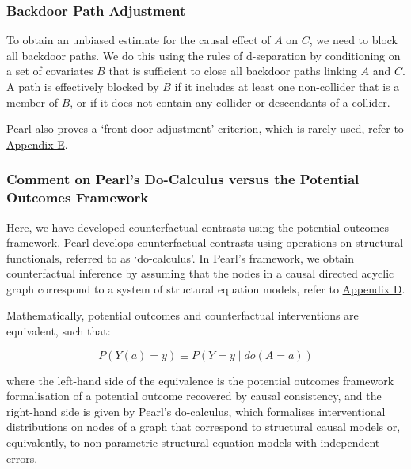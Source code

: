\documentclass[
  single column]{article}
\begin{document}
\subsubsection{Backdoor Path Adjustment}\label{backdoor-path-adjustment}

To obtain an unbiased estimate for the causal effect of \(A\) on \(C\),
we need to block all backdoor paths. We do this using the rules of
d-separation by conditioning on a set of covariates \(B\) that is
sufficient to close all backdoor paths linking \(A\) and \(C\). A path
is effectively blocked by \(B\) if it includes at least one non-collider
that is a member of \(B\), or if it does not contain any collider or
descendants of a collider.

Pearl also proves a `front-door adjustment' criterion, which is rarely
used, refer to \hyperref[id-app-e]{Appendix E}.

\subsubsection{Comment on Pearl's Do-Calculus versus the Potential
Outcomes
Framework}\label{comment-on-pearls-do-calculus-versus-the-potential-outcomes-framework}

Here, we have developed counterfactual contrasts using the potential
outcomes framework. Pearl develops counterfactual contrasts using
operations on structural functionals, referred to as `do-calculus'. In
Pearl's framework, we obtain counterfactual inference by assuming that
the nodes in a causal directed acyclic graph correspond to a system of
structural equation models, refer to \hyperref[id-app-d]{Appendix D}.

Mathematically, potential outcomes and counterfactual interventions are
equivalent, such that:

\[
P(Y(a) = y) \equiv P(Y = y \mid do(A = a))
\]

where the left-hand side of the equivalence is the potential outcomes
framework formalisation of a potential outcome recovered by causal
consistency, and the right-hand side is given by Pearl's do-calculus,
which formalises interventional distributions on nodes of a graph that
correspond to structural causal models or, equivalently, to
non-parametric structural equation models with independent errors.
\end{document}
